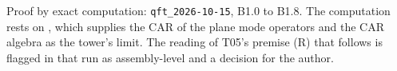 Proof by exact computation: \texttt{qft\_2026-10-15}, B1.0 to B1.8. The computation rests on , which supplies the CAR of the plane mode operators and the CAR algebra as the tower's limit. The reading of T05's premise (R) that follows is flagged in that run as assembly-level and a decision for the author.
